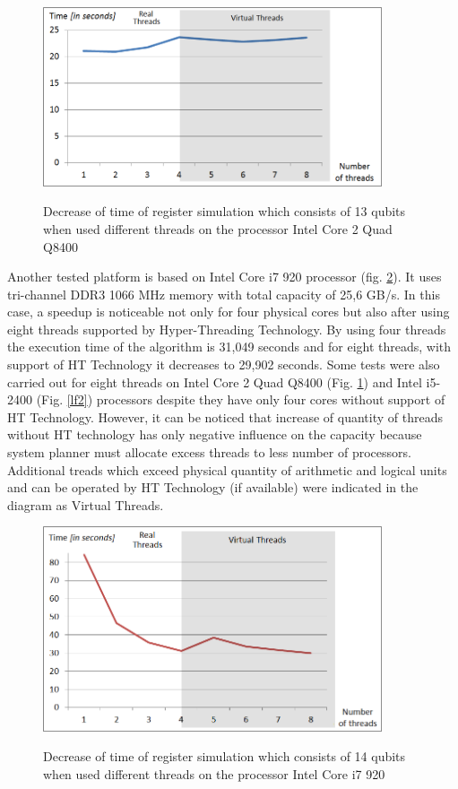 \documentclass[10pt, a5paper]{article}
\begin{document}
\begin{figure}
  \centering
  \includegraphics[width=10cm]{18_2012_5b.png}
  \label{lf5}
  \caption{Decrease of time of register simulation which consists of 13 qubits when used different threads on the processor Intel Core 2 Quad Q8400}
\end{figure}

Another tested platform is based on Intel Core i7 920 processor (fig. \ref{lf4}). It uses tri-channel DDR3 1066 MHz memory with total capacity of 25,6 GB/s. In this case, a speedup is noticeable not only for four physical cores but also after using eight threads supported by Hyper-Threading Technology. By using four threads the execution time of the algorithm is 31,049 seconds and for eight threads, with support of HT Technology it decreases to 29,902 seconds. Some tests were also carried out for eight threads on Intel Core 2 Quad Q8400 (Fig. \ref{lf5}) and Intel i5-2400 (Fig. \ref{lf2}) processors despite they have only four cores without support of HT Technology. However, it can be noticed that increase of quantity of threads without HT technology has only negative influence on the capacity because system planner must allocate excess threads to less number of processors. Additional treads which exceed physical quantity of arithmetic and logical units and can be operated by HT Technology (if available) were indicated in the diagram as Virtual Threads.

\begin{figure}
  \centering
  \includegraphics[width=10cm]{18_2012_4b.png}
  \label{lf4}
  \caption{Decrease of time of register simulation which consists of 14 qubits when used different threads on the processor Intel Core i7 920}
\end{figure}
\end{document}
